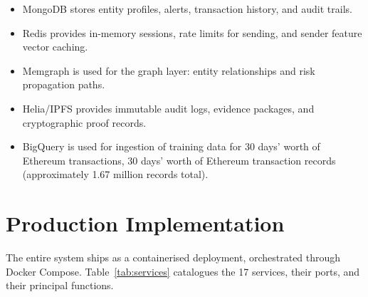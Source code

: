 \documentclass[journal]{IEEEtran}
\begin{document}
\begin{itemize}
\item MongoDB stores entity profiles, alerts, transaction history, and audit trails.
\item Redis provides in-memory sessions, rate limits for sending, and sender feature vector caching.
\item Memgraph is used for the graph layer: entity relationships and risk propagation paths.
\item Helia/IPFS provides immutable audit logs, evidence packages, and cryptographic proof records.
\item BigQuery is used for ingestion of training data for 30 days' worth of Ethereum transactions, 30 days' worth of Ethereum transaction records (approximately 1.67 million records total).
\end{itemize}

\section{Production Implementation}

The entire system ships as a containerised deployment, orchestrated through Docker Compose. Table~\ref{tab:services} catalogues the 17 services, their ports, and their principal functions.
\end{document}
